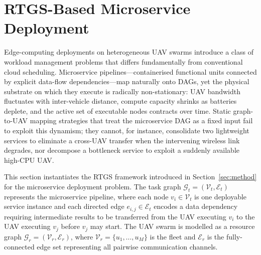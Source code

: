 %
%
%
%
%

\section{RTGS-Based Microservice Deployment}
\label{sec:microservice}

Edge-computing deployments on heterogeneous UAV swarms introduce a
class of workload management problems that differs fundamentally from
conventional cloud scheduling.
Microservice pipelines—containerised functional units connected by
explicit data-flow dependencies—map naturally onto DAGs, yet the
physical substrate on which they execute is radically non-stationary:
UAV bandwidth fluctuates with inter-vehicle distance, compute
capacity shrinks as batteries deplete, and the active set of
executable nodes contracts over time.
Static graph-to-UAV mapping strategies that treat the microservice
DAG as a fixed input fail to exploit this dynamism;
they cannot, for instance, consolidate two lightweight services to
eliminate a cross-UAV transfer when the intervening wireless link
degrades, nor decompose a bottleneck service to exploit a suddenly
available high-CPU UAV.

This section instantiates the RTGS framework introduced in
Section~\ref{sec:method} for the microservice deployment problem.
The task graph $\mathcal{G}_t = (\mathcal{V}_t, \mathcal{E}_t)$
represents the microservice pipeline, where each node
$v_i \in \mathcal{V}_t$ is one deployable service instance and each
directed edge $e_{i,j} \in \mathcal{E}_t$ encodes a data dependency
requiring intermediate results to be transferred from the UAV
executing $v_i$ to the UAV executing $v_j$ before $v_j$ may start.
The UAV swarm is modelled as a resource graph
$\mathcal{G}_r = (\mathcal{V}_r, \mathcal{E}_r)$, where
$\mathcal{V}_r = \{u_1, \ldots, u_M\}$ is the fleet and
$\mathcal{E}_r$ is the fully-connected edge set representing all
pairwise communication channels.

